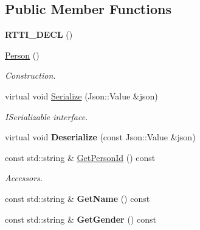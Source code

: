 \subsection*{Public Member Functions}
\begin{DoxyCompactItemize}
\item 
\mbox{\label{class_person_a89f2b3baabafacd2daf345d87a7d0a06}} 
{\bfseries R\+T\+T\+I\+\_\+\+D\+E\+CL} ()
\item 
\mbox{\label{class_person_a0397c6f89fafc12e738923f612bc41a3}} 
\hyperlink{class_person_a0397c6f89fafc12e738923f612bc41a3}{Person} ()
\begin{DoxyCompactList}\small\item\em Construction. \end{DoxyCompactList}\item 
\mbox{\label{class_person_a08db889ed330ed1c638b4d173442239e}} 
virtual void \hyperlink{class_person_a08db889ed330ed1c638b4d173442239e}{Serialize} (Json\+::\+Value \&json)
\begin{DoxyCompactList}\small\item\em I\+Serializable interface. \end{DoxyCompactList}\item 
\mbox{\label{class_person_a92b7f3962aed21de3bf2af92d404aed4}} 
virtual void {\bfseries Deserialize} (const Json\+::\+Value \&json)
\item 
\mbox{\label{class_person_a0bd18ad14cb9ddf031d49ead5558bd51}} 
const std\+::string \& \hyperlink{class_person_a0bd18ad14cb9ddf031d49ead5558bd51}{Get\+Person\+Id} () const
\begin{DoxyCompactList}\small\item\em Accessors. \end{DoxyCompactList}\item 
\mbox{\label{class_person_a048949c892efca3a9ab6a47376fce65f}} 
const std\+::string \& {\bfseries Get\+Name} () const
\item 
\mbox{\label{class_person_a20cc261ce7dede3d15d1bc2b0a08cf57}} 
const std\+::string \& {\bfseries Get\+Gender} () const
\item 
\mbox{\label{class_person_af81de021d5dcb15fe362c130d6e8797d}} 

\end{DoxyCompactItemize}
